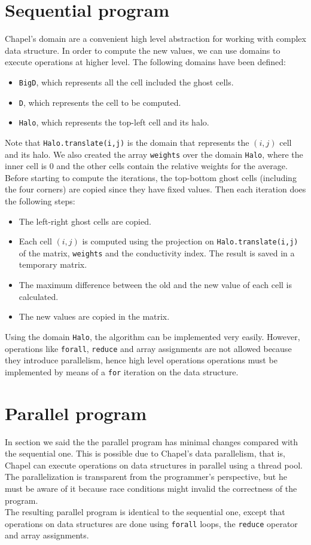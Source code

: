 \documentclass{article}
\begin{document}
\section{Sequential program}
Chapel's domain are a convenient high level abstraction for working with complex data structure. In order to compute the new values, we can use domains to execute operations at higher level. The following domains have been defined:
\begin{itemize}
    \item \texttt{BigD}, which represents all the cell included the ghost cells.
    \item \texttt{D}, which represents the cell to be computed.
    \item \texttt{Halo}, which represents the top-left cell and its halo.
\end{itemize}
Note that \texttt{Halo.translate(i,j)} is the domain that represents the $(i,j)$ cell and its halo. We also created the array \texttt{weights} over the domain \texttt{Halo}, where the inner cell is 0 and the other cells contain the relative weights for the average. \\
Before starting to compute the iterations, the top-bottom ghost cells (including the four corners) are copied since they have fixed values. Then each iteration does the following steps:
\begin{itemize}
    \item The left-right ghost cells are copied.
    \item Each cell $(i,j)$ is computed using the projection on \texttt{Halo.translate(i,j)} of the matrix, \texttt{weights} and the conductivity index. The result is saved in a temporary matrix.
    \item The maximum difference between the old and the new value of each cell is calculated.
    \item The new values are copied in the matrix.
\end{itemize}
Using the domain \texttt{Halo}, the algorithm can be implemented very easily. However, operations like \texttt{forall}, \texttt{reduce} and array assignments are not allowed because they introduce parallelism, hence high level operations operations must be implemented by means of a \texttt{for} iteration on the data structure.

\section{Parallel program}
In section  we said the the parallel program has minimal changes compared with the sequential one. This is possible due to Chapel's data parallelism, that is, Chapel can execute operations on data structures in parallel using a thread pool. The parallelization is transparent from the programmer's perspective, but he must be aware of it because race conditions might invalid the correctness of the program. \\
The resulting parallel program is identical to the sequential one, except that operations on data structures are done using \texttt{forall} loops, the \texttt{reduce} operator and array assignments.
\end{document}
